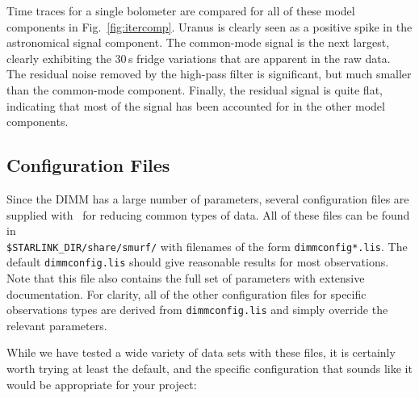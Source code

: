 \documentclass[twoside,11pt]{starlink}
\providecommand{\smurf}{\xref{\textsc{Smurf}}{sun258}{}}
\begin{document}
Time traces for a single bolometer are compared for all of these model
components in Fig.~\ref{fig:itercomp}. Uranus is clearly seen as a
positive spike in the astronomical signal component. The common-mode
signal is the next largest, clearly exhibiting the 30\,s fridge
variations that are apparent in the raw data. The residual noise
removed by the high-pass filter is significant, but much smaller than
the common-mode component. Finally, the residual signal is quite flat,
indicating that most of the signal has been accounted for in the other
model components.

\subsection{Configuration Files}
\label{sec:config}

Since the DIMM has a large number of parameters, several configuration
files are supplied with \smurf\ for reducing common types of data. All
of these files can be found in
\\ \texttt{\$STARLINK\_DIR/share/smurf/} with filenames of the form
\texttt{dimmconfig*.lis}. The default \texttt{dimmconfig.lis} should
give reasonable results for most observations. Note that this file
also contains the full set of parameters with extensive
documentation. For clarity, all of the other configuration files for
specific observations types are derived from \texttt{dimmconfig.lis}
and simply override the relevant parameters.

While we have tested a wide variety of data sets with these files, it
is certainly worth trying at least the default, and the specific
configuration that sounds like it would be appropriate for your
project:
\end{document}
